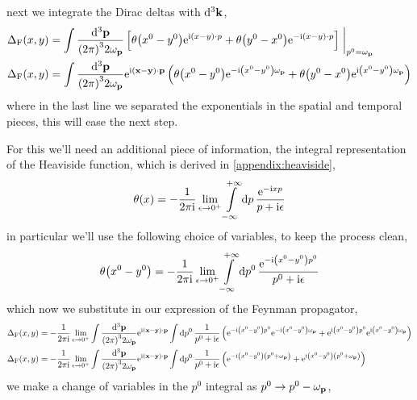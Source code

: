 next we integrate the Dirac deltas with $\dd[3]{\vb k}$,
\begin{align}
    \Delta_{\textnormal{F}}\qty(x,y) &= \int\frac{\dd[3]{\vb p}}{\qty(2\pi)^32\omega_{\vb p}}\left[\theta\qty(x^0-y^0)\e^{\im \qty(x-y)\cdot p}+\theta\qty(y^0-x^0)\e^{-\im \qty(x-y)\cdot p}\right]\eval_{p^0=\omega_{\vb p}}\\
    \Delta_{\textnormal{F}}\qty(x,y) &= \int\frac{\dd[3]{\vb p}}{\qty(2\pi)^32\omega_{\vb p}}\e^{\im \qty(\vb x-\vb y)\cdot \vb p}\left(\theta\qty(x^0-y^0)\e^{-\im \qty(x^0-y^0)\omega_{\vb p}}+\theta\qty(y^0-x^0)\e^{\im \qty(x^0-y^0)\omega_{\vb p}}\right)
\end{align}
where in the last line we separated the exponentials in the spatial and temporal pieces, this will ease the next step.

For this we'll need an additional piece of information, the integral representation of the Heaviside function, which is derived in \cref{appendix:heaviside},
\begin{align}
    \theta\qty(x) = -\frac{1}{2\pi\textnormal{i}}\lim\limits_{\epsilon\rightarrow 0^+}\int\limits_{-\infty}^{+\infty}\dd{p}\frac{\textnormal{e}^{-\textnormal{i} xp}}{p+\textnormal{i}\epsilon}
\end{align}
in particular we'll use the following choice of variables, to keep the process clean,
\begin{align}
    \theta\qty(x^0-y^0) = -\frac{1}{2\pi\textnormal{i}}\lim\limits_{\epsilon\rightarrow 0^+}\int\limits_{-\infty}^{+\infty}\dd{p^0}\frac{\textnormal{e}^{-\textnormal{i} \qty(x^0-y^0)p^0}}{p^0+\textnormal{i}\epsilon}
\end{align}
which now we substitute in our expression of the Feynman propagator,
\begin{align}
    \Delta_{\textnormal{F}}\qty(x,y) &=-\frac{1}{2\pi\textnormal{i}}\lim\limits_{\epsilon\rightarrow 0^+} \int\frac{\dd[3]{\vb p}}{\qty(2\pi)^32\omega_{\vb p}}\textnormal{e}^{\textnormal{i} \qty(\vb x-\vb y)\cdot \vb p}\int\dd{p^0}\frac{1}{p^0+\textnormal{i}\epsilon}\left(\textnormal{e}^{-\textnormal{i} \qty(x^0-y^0)p^0}\textnormal{e}^{-\textnormal{i} \qty(x^0-y^0)\omega_{\vb p}}+\textnormal{e}^{\textnormal{i} \qty(x^0-y^0)p^0}\textnormal{e}^{\textnormal{i} \qty(x^0-y^0)\omega_{\vb p}}\right)\\
    \Delta_{\textnormal{F}}\qty(x,y) &=-\frac{1}{2\pi\textnormal{i}}\lim\limits_{\epsilon\rightarrow 0^+} \int\frac{\dd[3]{\vb p}}{\qty(2\pi)^32\omega_{\vb p}}\textnormal{e}^{\textnormal{i} \qty(\vb x-\vb y)\cdot \vb p}\int\dd{p^0}\frac{1}{p^0+\textnormal{i}\epsilon}\left(\textnormal{e}^{-\textnormal{i} \qty(x^0-y^0)\qty(p^0+\omega_{\vb p})}+\textnormal{e}^{\textnormal{i} \qty(x^0-y^0)\qty(p^0+\omega_{\vb p})}\right)
\end{align}
we make a change of variables in the $p^0$ integral as $p^0\rightarrow p^0-\omega_{\vb p}$,

